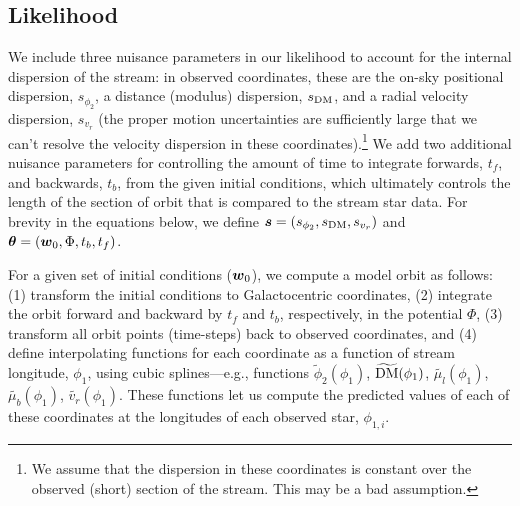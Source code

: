 \subsection{Likelihood}

We include three nuisance parameters in our likelihood to account for the internal dispersion of the stream: in observed coordinates, these are the on-sky positional dispersion, $s_{\phi_2}$, a distance (modulus) dispersion, $s_{{\rm DM}}$, and a radial velocity dispersion, $s_{v_r}$ (the proper motion uncertainties are sufficiently large that we can't resolve the velocity dispersion in these coordinates).\footnote{We assume that the dispersion in these coordinates is constant over the observed (short) section of the stream. This may be a bad assumption.} We add two additional nuisance parameters for controlling the amount of time to integrate forwards, $t_f$, and backwards, $t_b$, from the given initial conditions, which ultimately controls the length of the section of orbit that is compared to the stream star data. For brevity in the equations below, we define $\boldsymbol{s} = (s_{\phi_2}, s_{{\rm DM}}, s_{v_r})$ and $\boldsymbol{\theta} = (\boldsymbol{w}_0, \Phi, t_b, t_f)$.

For a given set of initial conditions ($\boldsymbol{w}_0$), we compute a model orbit as follows: (1) transform the initial conditions to Galactocentric coordinates, (2) integrate the orbit forward and backward by $t_f$ and $t_b$, respectively, in the potential $\Phi$, (3) transform all orbit points (time-steps) back to observed coordinates, and (4) define interpolating functions for each coordinate as a function of stream longitude, $\phi_1$, using cubic splines---e.g., functions $\widetilde{\phi}_{2}(\phi_1)$, $\widetilde{{\rm DM}}(\phi_1)$, $\widetilde{\mu_l}(\phi_1)$, $\widetilde{\mu_b}(\phi_1)$, $\widetilde{v_r}(\phi_1)$. These functions let us compute the predicted values of each of these coordinates at the longitudes of each observed star, $\phi_{1,i}$.

